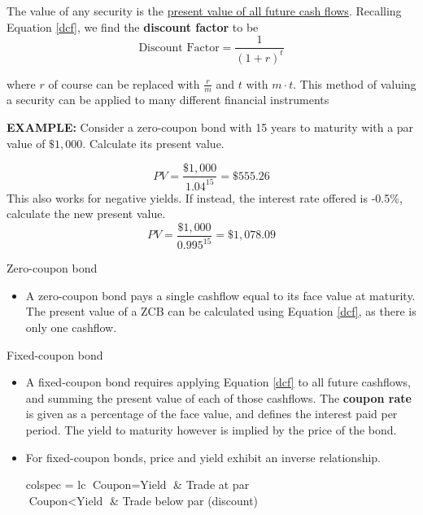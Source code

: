 \documentclass[../notes_compiled.tex]{subfiles}
\begin{document}
\begin{itemize}
\item The value of any security is the \underline{present value of all future cash flows}. Recalling Equation \ref{dcf}, we find the \textbf{discount factor} to be
\begin{equation}
\text{Discount Factor} = \frac{1}{(1+r)^{t}}
\end{equation}
\item[] where $r$ of course can be replaced with $\frac{r}{m}$ and $t$ with $m\cdot t$. This method of valuing a security can be applied to many different financial instruments
{\color{RedViolet}
\item[] \textbf{EXAMPLE:} Consider a zero-coupon bond with 15 years to maturity with a par value of $\$1,000$. Calculate its present value.
}
{\color{RoyalBlue}
\begin{equation*}
PV = \frac{\$1,000}{1.04^{15}}=\$555.26
\end{equation*}
}
{\color{RedViolet}
This also works for negative yields. If instead, the interest rate offered is -0.5\%, calculate the new present value.
}
{\color{RoyalBlue}
\begin{equation*}
PV = \frac{\$1,000}{0.995^{15}} = \$1,078.09
\end{equation*}
}
\clearpage
\item[] Zero-coupon bond
\begin{itemize}
\item[] A zero-coupon bond pays a single cashflow equal to its face value at maturity. The present value of a ZCB can be calculated using Equation \ref{dcf}, as there is only one cashflow.
\end{itemize}
\item[] Fixed-coupon bond
\begin{itemize}
\item[] A fixed-coupon bond requires applying Equation \ref{dcf} to all future cashflows, and summing the present value of each of those cashflows. The \textbf{coupon rate} is given as a percentage of the face value, and defines the interest paid per period. The yield to maturity however is implied by the price of the bond.
\item[] For fixed-coupon bonds, price and yield exhibit an inverse relationship. 
\begin{table}[H]
\centering
\begin{tblr}{colspec = {lc}}
\hline[1.25pt]
$\text{Coupon} = \text{Yield}$ & Trade at par \\
$\text{Coupon} < \text{Yield}$ & Trade below par (discount) \\

\end{tblr}
\end{table}
\end{itemize}
\end{itemize}
\end{document}
